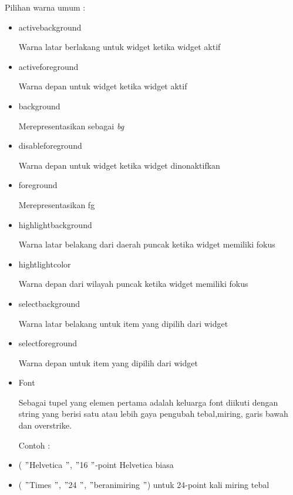 \documentclass [12pt,a4paper,notitlepage,oneside,bahasa]{article}
\begin{document}
 \par
\vspace{12pt}
Pilihan warna umum : \par
\noindent 
\begin{itemize}
\item activebackground \par
Warna latar berlakang untuk widget ketika widget aktif \par
\noindent 
\item activeforeground \par
Warna depan untuk widget ketika widget aktif \par
\noindent 
\item background \par
Merepresentasikan sebagai \textit{bg} \par
\noindent 
\item disableforeground \par
Warna depan untuk widget ketika widget dinonaktifkan \par
\noindent 
\item foreground \par
Merepresentasikan fg \par
\noindent 
\item highlightbackground \par
Warna latar belakang dari daerah puncak ketika widget memiliki fokus \par
\noindent 
\item hightlightcolor \par
Warna depan dari wilayah puncak ketika widget memiliki fokus \par
\noindent 
\item selectbackground \par
Warna latar belakang untuk item yang dipilih dari widget \par
\noindent 
\item selectforeground \par
Warna depan untuk item yang dipilih dari widget \par
\noindent 
\item Font \par
\noindent 
Sebagai tupel yang elemen pertama adalah keluarga font diikuti dengan string yang berisi satu atau lebih gaya pengubah tebal,miring, garis bawah dan overstrike. \par
\noindent 
Contoh : \par
\noindent 
\item ( $ " $Helvetica $ " $, $ " $16 $ " $-point Helvetica biasa \par
\noindent 
\item ( $ " $Times $ " $, $ " $24 $ " $, $ " $beranimiring $ " $) untuk 24-point kali miring tebal\end{itemize}
\end{document}
